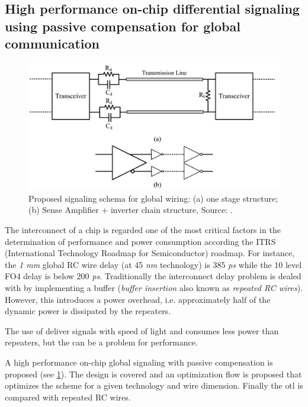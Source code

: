 
\subsection{High performance on-chip differential signaling using passive compensation for global communication \cite{zhang2009high}} \label{ss:zhang2009high}

\begin{figure}[H]
	\centering
	\includegraphics[width=0.95\linewidth]{Figures/Rep3Overview.png}
	\caption{Proposed signaling schema for global wiring: (a) one stage structure; (b) Sense Amplifier + inverter chain structure, Source: \cite{zhang2009high}.} 
    \label{fig:rep3:overview}
\end{figure}

The interconnect of a chip is regarded one of the most critical factors in the determination of performance and power consumption according the ITRS (International Technology Roadmap for Semiconductor) roadmap.
For instance, the \textit{1 mm} global RC wire delay (at 45 \textit{nm} technology) is 385 \textit{ps} while the 10 level FO4 delay is below 200 \textit{ps}.
Traditionally the interconnect delay problem is dealed with by implementing a buffer (\textit{buffer insertion} also known as \textit{repeated RC wires}).
However, this introduces a power overhead, i.e. approximately half of the dynamic power is dissipated by the repeaters.

\motive
The use of  deliver signals with speed of light and consumes less power than repeaters, but the  can be a problem for performance.

\objective
A high performance on-chip global signaling with passive compensation is proposed (see \cref{fig:rep3:overview}).
The design is covered and an optimization flow is proposed that optimizes the scheme for a given technology and wire dimension.
Finally the \ac{otl} is compared with repeated RC wires.

